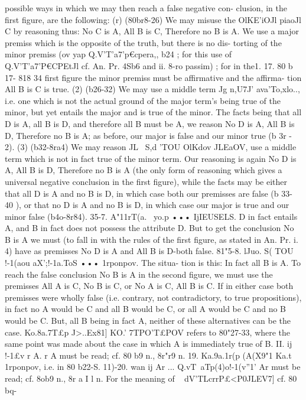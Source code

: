 {{{{{{{{{{{{{possible ways in which we may then reach a false negative con-
clusion, in the first figure, are the following:
(r) (80br8-26) We may misuse the OlKE'iOJl piaoJl C by reasoning
thus: No C is A, All B is C, Therefore no B is A. We use a major
premiss which is the opposite of the truth, but there is no dis-
torting of the minor premiss (ov yap Q.V'T'a7'p€cpera,, b24 ; for this
use of Q.V'T'a7'P€CPEtJl cf. An. Pr. 4Sb6 and ii. 8-ro passim) ; for in the1. 17. 80 b 17- 818 34
first figure the minor premiss must be affirmative and the affirma-
tion All B is C is true.
(2) (b26-32) We may use a middle term Jg n,U7J' ava'To,xlo.., i.e.
one which is not the actual ground of the major term's being true
of the minor, but yet entails the major and is true of the minor.
The facts being that all D is A, all B is D, and therefore all B
must be A, we reason No D is A, All B is D, Therefore no B is
A; as before, our major is false and our minor true (b 3r - 2).
(3) (b32-8ra4) We may reason JL~ S,d 'TOU OlKdov JLEaOV, use a
middle term which is not in fact true of the minor term. Our
reasoning is again No D is A, All B is D, Therefore no B is A
(the only form of reasoning which gives a universal negative
conclusion in the first figure), while the facts may be either that
all D is A and no B is D, in which case both our premisses are
false (b 33- 40 ), or that no D is A and no B is D, in which case our
major is true and our minor false (b4o-8r84).
35-7. A"11rT(a.~ yo.p ••• IjIEUSELS. D in fact entails A, and B
in fact does not possess the attribute D. But to get the conclusion
No B is A we must (to fall in with the rules of the first figure,
as stated in An. Pr. i. 4) have as premisses No D is A and All
B is D-both false.
81"5-8. lJuo. S( TOU !-1(aou aX';!-1a.ToS ••• 1rponpov. The situa-
tion is this: In fact all B is A. To reach the false conclusion
No B is A in the second figure, we must use the premisses All
A is C, No B is C, or No A is C, All B is C. If in either case both
premisses were wholly false (i.e. contrary, not contradictory, to
true propositions), in fact no A would be C and all B would be
C, or all A would be C and no B would be C. But, all B being in
fact A, neither of these alternatives can be the case. Ko.8a.7T£p
J>..Ex81] KO.' 7TPO'T£POV refers to 80"27-33, where the same point was
made about the case in which A is immediately true of B.
II. ij !-1£v r A. r A must be read; cf. 80 b9 n., 8r"r9 n.
19. Ka.9a.1r(p (A(X9"1 Ka.t 1rponpov, i.e. in 80 b22-S.
11)-20. wan ij Ar ... Q.vT~aTp(4)o!-1(v''1' Ar must be read; cf.
8ob9 n., 8r a I l n. For the meaning of ~ dV'TLcrrP£<P0JLEV7] cf. 80 bq-
}}}}}}}}}}}}}
